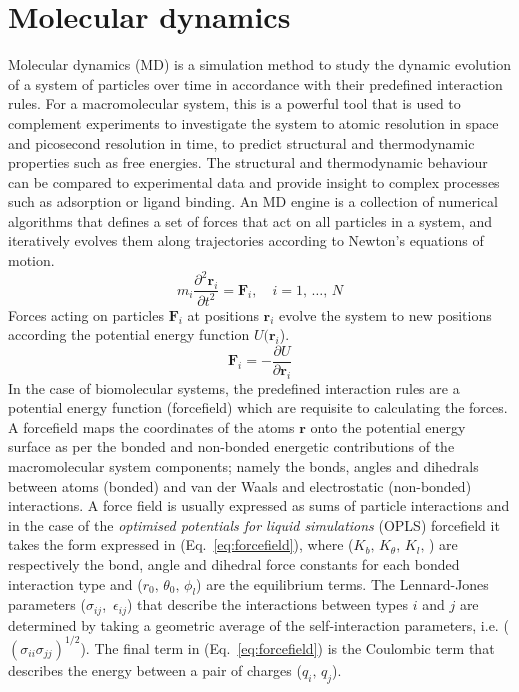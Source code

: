 \section{Molecular dynamics}\label{chapter:MD}
%
Molecular dynamics (MD) is a simulation method to study the dynamic evolution of a system of particles over time in accordance with their predefined interaction rules. For a macromolecular system, this is a powerful tool that is used to complement experiments to investigate the system to atomic resolution in space and picosecond resolution in time, to predict structural and thermodynamic properties such as free energies.\cite{mcquarrie1965statistical} The structural and thermodynamic behaviour can be compared to experimental data and provide insight to complex processes such as adsorption or ligand binding. An MD engine is a collection of numerical algorithms that defines a set of forces that act on all particles in a system, and iteratively evolves them along trajectories according to Newton's equations of motion.
%
\begin{equation} \label{eq:newtons2nd}
m_i \frac{\partial^2\mathbf{r}_i}{\partial t^2}=\mathbf{F}_i,\quad  i = 1,\,\dots,\,N
\end{equation}
%
Forces acting on particles $\mathbf{F}_i$ at positions $\mathbf{r}_i$ evolve the system to new positions according the potential energy function $U(\mathbf{r}_i$).
%
\begin{equation} \label{eq:newton}
\mathbf{F}_i = -\frac{\partial U}{\partial \mathbf{r}_i}
\end{equation}
%
In the case of biomolecular systems, the predefined interaction rules are a potential energy function (forcefield) which are requisite to calculating the forces. A forcefield maps the coordinates of the atoms $\mathbf{r}$ onto the potential energy surface as per the bonded and non-bonded energetic contributions of the macromolecular system components; namely the bonds, angles and dihedrals between atoms (bonded) and van der Waals and electrostatic (non-bonded) interactions.\cite{de2016role} A force field is usually expressed as sums of particle interactions and in the case of the \textit{optimised potentials for liquid simulations} (OPLS) forcefield \cite{jorgensen1988opls, jorgensen1996development} it takes the form expressed in (Eq.~\ref{eq:forcefield}), where ($K_b,\,K_{\theta},\,K_l,\,$) are respectively the bond, angle and dihedral force constants for each bonded interaction type and ($r_0,\, \theta_0,\, \phi_l$) are the equilibrium terms. The Lennard-Jones parameters ($\sigma_{ij}$,\, $\epsilon_{ij}$) that describe the interactions between types $i$ and $j$ are determined by taking a geometric average of the self-interaction parameters, i.e. ($(\sigma_{ii}\sigma_{jj})^{1/2}$). The final term in (Eq.~\ref{eq:forcefield}) is the Coulombic term that describes the energy between a pair of charges ($q_i,\,q_j$). 

